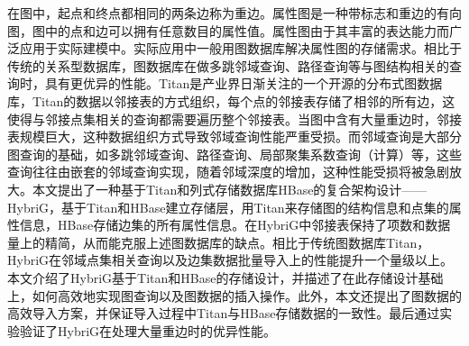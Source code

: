 
\begin{cabstract}
	在图中，起点和终点都相同的两条边称为重边。属性图是一种带标志和重边的有向图，图中的点和边可以拥有任意数目的属性值。属性图由于其丰富的表达能力而广泛应用于实际建模中。实际应用中一般用图数据库解决属性图的存储需求。相比于传统的关系型数据库，图数据库在做多跳邻域查询、路径查询等与图结构相关的查询时，具有更优异的性能。Titan是产业界日渐关注的一个开源的分布式图数据库，Titan的数据以邻接表的方式组织，每个点的邻接表存储了相邻的所有边，这使得与邻接点集相关的查询都需要遍历整个邻接表。当图中含有大量重边时，邻接表规模巨大，这种数据组织方式导致邻域查询性能严重受损。而邻域查询是大部分图查询的基础，如多跳邻域查询、路径查询、局部聚集系数查询（计算）等，这些查询往往由嵌套的邻域查询实现，随着邻域深度的增加，这种性能受损将被急剧放大。本文提出了一种基于Titan和列式存储数据库HBase的复合架构设计——HybriG，基于Titan和HBase建立存储层，用Titan来存储图的结构信息和点集的属性信息，HBase存储边集的所有属性信息。在HybriG中邻接表保持了项数和数据量上的精简，从而能克服上述图数据库的缺点。相比于传统图数据库Titan，HybriG在邻域点集相关查询以及边集数据批量导入上的性能提升一个量级以上。本文介绍了HybriG基于Titan和HBase的存储设计，并描述了在此存储设计基础上，如何高效地实现图查询以及图数据的插入操作。此外，本文还提出了图数据的高效导入方案，并保证导入过程中Titan与HBase存储数据的一致性。最后通过实验验证了HybriG在处理大量重边时的优异性能。
\end{cabstract}

